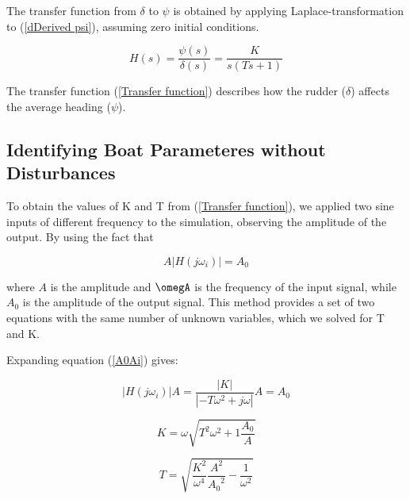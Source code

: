 The transfer function from $\delta$ to $\psi$ is obtained by applying Laplace-transformation to (\ref{dDerived psi}), assuming zero initial conditions.

\begin{equation}\label{Transfer function}
    H(s) = \frac{{\psi (s)}}{{\delta (s)}} = \frac{K}{{s(Ts + 1)}}
\end{equation}

The transfer function (\ref{Transfer function}) describes how the rudder ($\delta$) affects the average heading ($\psi$).


\subsection{Identifying Boat Parameteres without Disturbances}

To obtain the values of K and T from (\ref{Transfer function}), we applied two sine inputs of different frequency to the simulation, observing the amplitude of the output. By using the fact that

\begin{equation}\label{A0Ai}
    {A}\left| {H(j{\omega _i})} \right| = {A_0}
\end{equation}

where $A$ is the amplitude and $\omegA$ is the frequency of the input signal, while $A_0$ is the amplitude of the output signal. This method provides a set of two equations with the same number of unknown variables, which we solved for T and K.

Expanding equation (\ref{A0Ai}) gives:
    
\begin{equation}\label{Hjw}
        \left| {H(j{\omega _i})} \right|{A} = \frac{{\left| K \right|}}{{\left| { - T{\omega ^2} + j\omega } \right|}}{A} = {A_0}
\end{equation}

\begin{equation}\label{K}
    K = \omega \sqrt {{T^2}{\omega ^2} + 1\frac{{{A_0}}}{{{A}}}}
\end{equation}

\begin{equation}\label{T}
    T = \sqrt {\frac{{{K^2}}}{{{\omega ^4}}}\frac{{{A}^2}}{{{A_0}^2}} - \frac{1}{{{\omega ^2}}}}
\end{equation}

